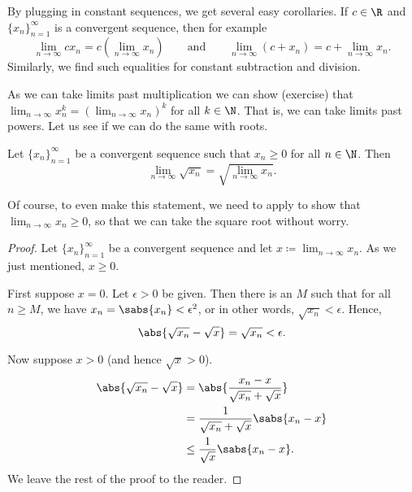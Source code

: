 By plugging in constant sequences, we get several easy corollaries.
If $c \in \R$ and $\{ x_n \}_{n=1}^\infty$ is a convergent sequence, then
for example
\begin{equation*}
\lim_{n \to \infty} c x_n = 
c \left( \lim_{n \to \infty} x_n \right) \qquad
\text{and}
\qquad
\lim_{n \to \infty} (c + x_n) = 
c + \lim_{n \to \infty} x_n .
\end{equation*}
Similarly, we find such equalities for constant subtraction and division.

As we can take limits past multiplication we can show (exercise)
that $\lim_{n\to\infty} x_n^k = {(\lim_{n\to\infty} x_n)}^k$ for all $k \in \N$.
That is, we can take limits
past powers.  Let us see if we can do the same with roots.

\begin{prop}
\pagebreak[2]
Let $\{ x_n \}_{n=1}^\infty$ be a convergent sequence such
that $x_n \geq 0$ for all $n \in \N$.
Then
\begin{equation*}
\lim_{n\to\infty} \sqrt{x_n} =
\sqrt{ \lim_{n\to\infty} x_n } .
\end{equation*}
\end{prop}

Of course, to even make this statement, we need to apply
 to show
that
$\lim_{n\to\infty} x_n \geq 0$, so that we can take the square root without
worry.

\begin{proof}
Let $\{ x_n \}_{n=1}^\infty$ be a convergent sequence and let $x \coloneqq
\lim_{n\to\infty} x_n$.
As we just mentioned, $x \geq 0$.

First suppose $x=0$.  Let $\epsilon > 0$ be given.
Then there is an $M$ such that for all $n \geq M$, we have
$x_n = \sabs{x_n} < \epsilon^2$, or in other words, $\sqrt{x_n} < \epsilon$.
Hence,
\begin{equation*}
\abs{\sqrt{x_n} - \sqrt{x}} =
\sqrt{x_n} < \epsilon.
\end{equation*}

Now suppose $x > 0$ (and hence $\sqrt{x} > 0$).
\begin{equation*}
\begin{split}
\abs{\sqrt{x_n}-\sqrt{x}} &= 
\abs{\frac{x_n-x}{\sqrt{x_n}+\sqrt{x}}} \\
&=
\frac{1}{\sqrt{x_n}+\sqrt{x}}
\sabs{x_n-x} \\
& \leq
\frac{1}{\sqrt{x}}
\sabs{x_n-x} .
\end{split}
\end{equation*}
We leave the rest of the proof to the reader.
\end{proof}

